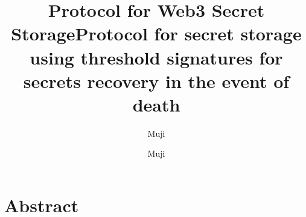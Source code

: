 \documentclass[a4paper,titlepage,oneside]{article}
\title{Protocol for Web3 Secret Storage}
\author{Muji}
\renewcommand{\paragraph}{\small}
\begin{document}
 
	
\fancyhead{}
\fancyfoot{}

\rhead{\textbf{\textsc{}}}
\lfoot{\thepage}

\title{Protocol for secret storage using threshold signatures for secrets recovery in the event of death}

\author{Muji}

\maketitle

\tableofcontents

\section{Abstract}
\paragraph{}
\end{document}
